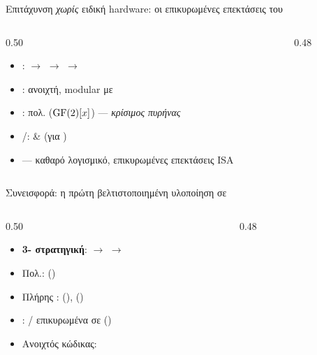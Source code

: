 \begin{frame}{Επιτάχυνση  \emph{χωρίς} ειδική hardware: οι επικυρωμένες επεκτάσεις  του }
  \begin{columns}[T]
    \begin{column}{0.50\textwidth}
      \begin{itemize}
        \item {}:  $\to$  $\to$  $\to$ 
        \item {}: ανοιχτή, modular  με 
        \item \HL{\Zbc/\Zvbc}:  πολ. ($\mathrm{GF}(2)[x]$) — \emph{κρίσιμος πυρήνας}
        \item \Zbb/\Zvbb:  \&  (για )
        \item {} — καθαρό λογισμικό, επικυρωμένες επεκτάσεις ISA
      \end{itemize}
    \end{column}
    \begin{column}{0.48\textwidth}
      \centering
      \resizebox{\columnwidth}{!}{%
      }
    \end{column}
  \end{columns}
\end{frame}

\begin{frame}{Συνεισφορά: η πρώτη βελτιστοποιημένη  υλοποίηση \HQC σε }
  \begin{columns}[T]
    \begin{column}{0.50\textwidth}
      \begin{itemize}
        \item \textbf{3- στρατηγική}:  $\to$  $\to$ 
        \item Πολ.:  ()
        \item Πλήρης \KEM:  (),  ()
        \item {}: / επικυρωμένα σε  ()
        \item Ανοιχτός κώδικας: 
      \end{itemize}
    \end{column}
    \begin{column}{0.48\textwidth}
      \centering
      \resizebox{\columnwidth}{!}{%
      }
    \end{column}
  \end{columns}
\end{frame}
